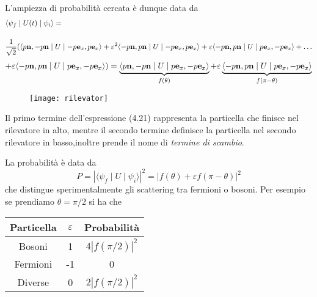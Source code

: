 L'ampiezza di probabilit\`a cercata \`e dunque data da 
\begin{align*}
	& \langle \psi_{f} \mid U(t) \mid \psi_{i} \rangle = \\[0.4cm]
	& \frac{1}{\sqrt{2}}(\langle p\bold{n} ,-p \bold{n}\mid U \mid -p \bold{e}_x , p\bold{e}_x\rangle + \varepsilon^2 \langle -p\bold{n},p\bold{n} \mid U \mid-p\bold{e}_x, p\bold{e}_x\rangle + \varepsilon\langle -p\bold{n},p\bold{n} \mid U \mid p\bold{e}_x, -p\bold{e}_x\rangle +   \ldots 
\end{align*}
\begin{align}
	+ \varepsilon \langle -p\bold{n},p\bold{n} \mid U \mid p\bold{e}_x, -p\bold{e}_x\rangle) = \underbrace{\langle p\bold{n},-p\bold{n} \mid U \mid p\bold{e}_x, -p\bold{e}_x\rangle}_{f(\theta)} + \varepsilon \underbrace{\langle -p\bold{n},p\bold{n} \mid U \mid p\bold{e}_x, -p\bold{e}_x\rangle}_{f(\pi-\theta  )}
\end{align}

\begin{figure}[!ht]
\vspace{0.1in}
\texttt{[image: rilevator]}	
\centering
\vspace{0.4in}
\end{figure}
Il primo termine dell'espressione (4.21) rappresenta la particella che finisce nel rilevatore in alto, mentre il secondo termine definisce la particella nel secondo rilevatore in basso,inoltre prende il nome di \textit{termine di scambio}.

La probabilit\`a \`e data da 
\begin{equation*}
	P = |\langle \psi_{f}\mid U \mid \psi_i \rangle|^2 = |f(\theta) + \varepsilon f(\pi - \theta)|^2
\end{equation*}
che distingue sperimentalmente gli scattering tra fermioni o bosoni. Per esempio se prendiamo $\theta = \pi /2$ si ha che 
\begin{table}[h!]
\centering
\begin{tabular}{c|c|c}

Particella & $\varepsilon$ & Probabilit\`a \\ \hline
Bosoni            & 1            & $4|f(\pi/2)|^2$            \\ 
Fermioni            & -1            & 0           \\ 
Diverse          & 0            & $2|f(\pi/2)|^2$            \\ 
\end{tabular}
\end{table}

